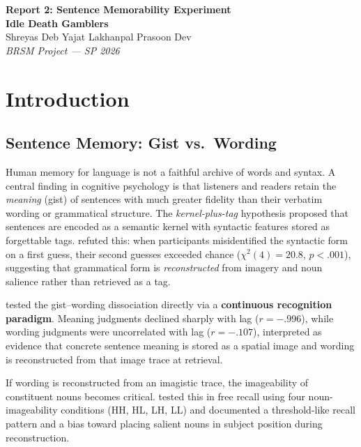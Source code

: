 \documentclass[12pt, a4paper]{article}
\begin{document}
\begin{center}
  \vspace*{-2em}
  {\Large \textbf{Report 2: Sentence Memorability Experiment}}\\[6pt]
  {\normalsize \textbf{Idle Death Gamblers}}\\[2pt]
  {\small Shreyas Deb \quad Yajat Lakhanpal \quad Prasoon Dev}\\[4pt]
  {\small \textit{BRSM Project --- SP 2026}}
\end{center}
\vspace{0.3em}

\section{Introduction}

\subsection{Sentence Memory: Gist vs.\ Wording}

Human memory for language is not a faithful archive of words and syntax.
A central finding in cognitive psychology is that listeners and readers
retain the \emph{meaning} (gist) of sentences with much greater fidelity
than their verbatim wording or grammatical structure. The
\emph{kernel-plus-tag} hypothesis \citep{miller1962,mehler1963} proposed
that sentences are encoded as a semantic kernel with syntactic features
stored as forgettable tags. \citet{bregman1968} refuted this: when
participants misidentified the syntactic form on a first guess, their
second guesses exceeded chance ($\chi^2(4) = 20.8$, $p < .001$),
suggesting that grammatical form is \emph{reconstructed} from imagery and
noun salience rather than retrieved as a tag.

\citet{begg1971} tested the gist--wording dissociation directly via a
\textbf{continuous recognition paradigm}. Meaning judgments declined
sharply with lag ($r = -.996$), while wording judgments were uncorrelated
with lag ($r = -.107$), interpreted as evidence that concrete sentence
meaning is stored as a spatial image and wording is reconstructed from
that image trace at retrieval.

If wording is reconstructed from an imagistic trace, the imageability of
constituent nouns becomes critical. \citet{james1973} tested this in free
recall using four noun-imageability conditions (HH, HL, LH, LL) and
documented a threshold-like recall pattern and a bias toward placing
salient nouns in subject position during reconstruction.
\end{document}
